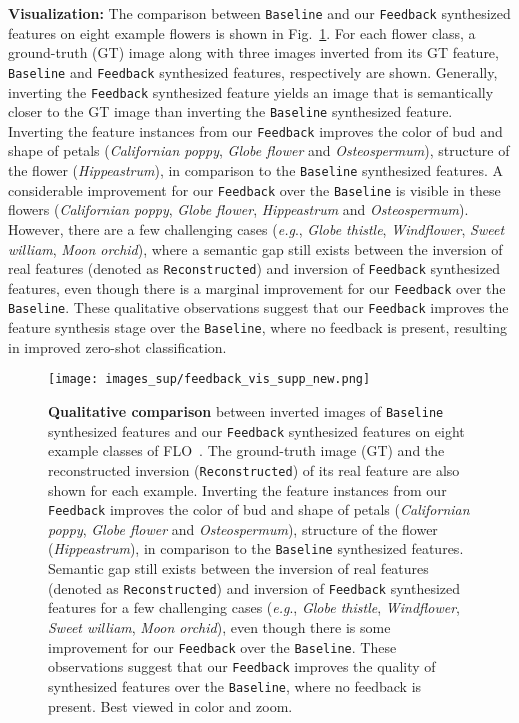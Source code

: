 \documentclass[runningheads]{llncs}
\def\eg{\emph{e.g}.}
\newcommand{\feedback}{\texttt{Feedback}}
\begin{document}
\noindent\textbf{Visualization:} The comparison between \texttt{Baseline} and our \texttt{Feedback} synthesized features on eight example flowers is shown in Fig.~\ref{fig_feat_viz}. For each flower class, a ground-truth (GT) image along with three images inverted from its GT feature, \texttt{Baseline} and \texttt{Feedback} synthesized features, respectively are shown. Generally, inverting the \texttt{Feedback} synthesized feature yields an image that is semantically closer to the GT image than inverting the \texttt{Baseline} synthesized feature. Inverting the feature instances from our \texttt{Feedback} improves the color of bud and shape of petals (\textit{Californian poppy}, \textit{Globe flower} and \textit{Osteospermum}), structure of the flower (\textit{Hippeastrum}), in comparison to the \texttt{Baseline} synthesized features. A considerable improvement for our \texttt{Feedback} over the \texttt{Baseline} is visible in these flowers (\textit{Californian poppy}, \textit{Globe flower}, \textit{Hippeastrum} and \textit{Osteospermum}). However, there are a few challenging cases (\eg, \textit{Globe thistle}, \textit{Windflower}, \textit{Sweet william}, \textit{Moon orchid}), where a semantic gap still exists between the inversion of real features (denoted as \texttt{Reconstructed}) and inversion of \feedback{} synthesized features, even though there is a marginal improvement for our \feedback{} over the \texttt{Baseline}. These qualitative observations suggest that our \texttt{Feedback} improves the feature synthesis stage over the \texttt{Baseline}, where no feedback is present, resulting in improved zero-shot classification.

\begin{figure}[t]
\centering
\texttt{[image: images\_sup/feedback\_vis\_supp\_new.png]}
\caption{\label{fig_feat_viz}\textbf{Qualitative comparison} between inverted images of \texttt{Baseline} synthesized features and our \texttt{Feedback} synthesized features on eight example classes of FLO~\cite{flo}. The ground-truth image (GT) and the reconstructed inversion (\texttt{Reconstructed}) of its real feature are also shown for each example. Inverting the feature instances from our \texttt{Feedback} improves the color of bud and shape of petals (\textit{Californian poppy}, \textit{Globe flower} and \textit{Osteospermum}), structure of the flower (\textit{Hippeastrum}), in comparison to the \texttt{Baseline} synthesized features. Semantic gap still exists between the inversion of real features (denoted as \texttt{Reconstructed}) and inversion of \feedback{} synthesized features for a few challenging cases (\eg, \textit{Globe thistle}, \textit{Windflower}, \textit{Sweet william}, \textit{Moon orchid}), even though there is some improvement for our \feedback{} over the \texttt{Baseline}. These observations suggest that our \texttt{Feedback} improves the quality of synthesized features over the \texttt{Baseline}, where no feedback is present. Best viewed in color and zoom.}
\end{figure}
\end{document}
